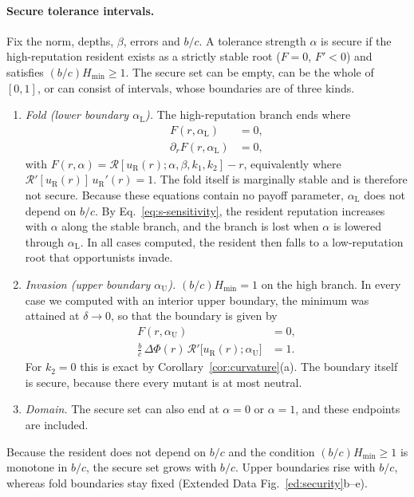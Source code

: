 \documentclass[10pt]{wlscirep}
\newcommand{\Rmap}{\mathscr{R}}            %
\newcommand{\Hmin}{H_{\min}}
\theoremstyle{plain}
\theoremstyle{remark}
\begin{document}
\paragraph{Secure tolerance intervals.} Fix the norm, depths, $\beta$, errors and $b/c$. A tolerance strength $\alpha$ is secure if the high-reputation resident exists as a strictly stable root ($F=0$, $F'<0$) and satisfies $(b/c)\Hmin\geq1$. The secure set can be empty, can be the whole of $[0,1]$, or can consist of intervals, whose boundaries are of three kinds.
\begin{enumerate}
\item \textit{Fold (lower boundary $\alpha_{\mathrm L}$).} The high-reputation branch ends where
\begin{equation}
\begin{aligned}
F(r,\alpha_{\mathrm L})&=0,\\
\partial_rF(r,\alpha_{\mathrm L})&=0,
\end{aligned}
\label{eq:s-fold}
\end{equation}
with $F(r,\alpha)=\Rmap[u_{\mathrm R}(r);\alpha,\beta,k_1,k_2]-r$, equivalently where $\Rmap'[u_{\mathrm R}(r)]\,u_{\mathrm R}'(r)=1$. The fold itself is marginally stable and is therefore not secure. Because these equations contain no payoff parameter, $\alpha_{\mathrm L}$ does not depend on $b/c$. By Eq.~\eqref{eq:s-sensitivity}, the resident reputation increases with $\alpha$ along the stable branch, and the branch is lost when $\alpha$ is lowered through $\alpha_{\mathrm L}$. In all cases computed, the resident then falls to a low-reputation root that opportunists invade.
\item \textit{Invasion (upper boundary $\alpha_{\mathrm U}$).} $(b/c)\Hmin=1$ on the high branch. In every case we computed with an interior upper boundary, the minimum was attained at $\delta\to0$, so that the boundary is given by
\begin{equation}
\begin{aligned}
F(r,\alpha_{\mathrm U})&=0,\\
\frac{b}{c}\,\Delta\Phi(r)\,\Rmap'\bigl[u_{\mathrm R}(r);\alpha_{\mathrm U}\bigr]&=1.
\end{aligned}
\label{eq:s-upper}
\end{equation}
For $k_2=0$ this is exact by Corollary~\ref{cor:curvature}(a). The boundary itself is secure, because there every mutant is at most neutral.
\item \textit{Domain.} The secure set can also end at $\alpha=0$ or $\alpha=1$, and these endpoints are included.
\end{enumerate}
Because the resident does not depend on $b/c$ and the condition $(b/c)\Hmin\geq1$ is monotone in $b/c$, the secure set grows with $b/c$. Upper boundaries rise with $b/c$, whereas fold boundaries stay fixed (Extended Data Fig.~\ref{ed:security}b--e).
\end{document}
